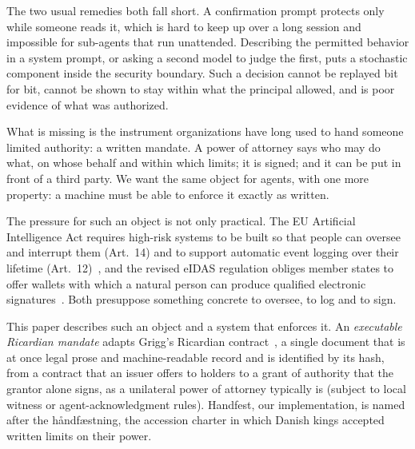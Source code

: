 \documentclass[10pt,twocolumn]{article}
\theoremstyle{plain}
\theoremstyle{definition}
\begin{document}
The two usual remedies both fall short. A confirmation prompt protects only while someone reads it, which is hard to keep up over a long session and impossible for sub-agents that run unattended. Describing the permitted behavior in a system prompt, or asking a second model to judge the first, puts a stochastic component inside the security boundary. Such a decision cannot be replayed bit for bit, cannot be shown to stay within what the principal allowed, and is poor evidence of what was authorized.

What is missing is the instrument organizations have long used to hand someone limited authority: a written mandate. A power of attorney says who may do what, on whose behalf and within which limits; it is signed; and it can be put in front of a third party. We want the same object for agents, with one more property: a machine must be able to enforce it exactly as written.

The pressure for such an object is not only practical. The EU Artificial Intelligence Act requires high-risk systems to be built so that people can oversee and interrupt them (Art.~14) and to support automatic event logging over their lifetime (Art.~12)~\cite{aiact2024}, and the revised eIDAS regulation obliges member states to offer wallets with which a natural person can produce qualified electronic signatures~\cite{eidas2024}. Both presuppose something concrete to oversee, to log and to sign.

This paper describes such an object and a system that enforces it. An \emph{executable Ricardian mandate} adapts Grigg's Ricardian contract~\cite{grigg2004ricardian}, a single document that is at once legal prose and machine-readable record and is identified by its hash, from a contract that an issuer offers to holders to a grant of authority that the grantor alone signs, as a unilateral power of attorney typically is (subject to local witness or agent-acknowledgment rules). Handfest, our implementation, is named after the h{\aa}ndf{\ae}stning, the accession charter in which Danish kings accepted written limits on their power.
\end{document}
